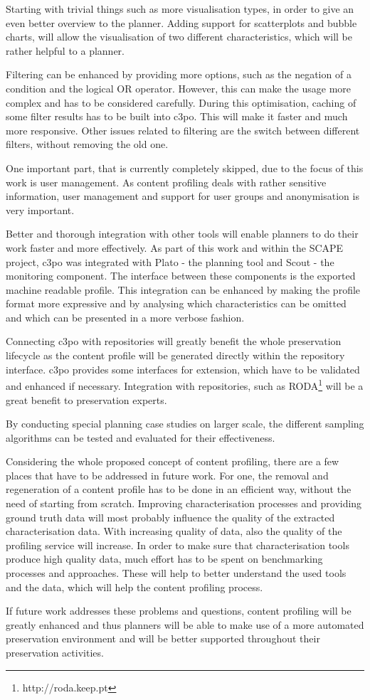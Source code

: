 Starting with trivial things such as more visualisation types, in order to give an even better overview to the planner. Adding support for scatterplots and bubble charts, will allow the visualisation of two different characteristics, which will be rather helpful to a planner.

Filtering can be enhanced by providing more options, such as the negation of a condition and the logical OR operator. However, this can make the usage more complex and has to be considered carefully. During this optimisation, caching of some filter results has to be built into c3po. This will make it faster and much more responsive.
Other issues related to filtering are the switch between different filters, without removing the old one.

One important part, that is currently completely skipped, due to the focus of this work is user management. As content profiling deals with rather sensitive information, user management and support for user groups and anonymisation is very important.

Better and thorough integration with other tools will enable planners to do their work faster and more effectively. As part of this work and within the SCAPE project, c3po was integrated with Plato - the planning tool and Scout - the monitoring component. The interface between these components is the exported machine readable profile. This integration can be enhanced by making the profile format more expressive and by analysing which characteristics can be omitted and which can be presented in a more verbose fashion.

Connecting c3po with repositories will greatly benefit the whole preservation lifecycle as the content profile will be generated directly within the repository interface. c3po provides some interfaces for extension, which have to be validated and enhanced if necessary. Integration with repositories, such as RODA\footnote{http://roda.keep.pt} will be a great benefit to preservation experts.

By conducting special planning case studies on larger scale, the different sampling algorithms can be tested and evaluated for their effectiveness.

Considering the whole proposed concept of content profiling, there are a few places that have to be addressed in future work. For one, the removal and regeneration of a content profile has to be done in an efficient way, without the need of starting from scratch. Improving characterisation processes and providing ground truth data will most probably influence the quality of the extracted characterisation data. With increasing quality of data, also the quality of the profiling service will increase. In order to make sure that characterisation tools produce high quality data, much effort has to be spent on benchmarking processes and approaches. These will help to better understand the used tools and the data, which will help the content profiling process. 

If future work addresses these problems and questions, content profiling will be greatly enhanced and thus planners will be able to make use of a more automated preservation environment and will be better supported throughout their preservation activities.	
